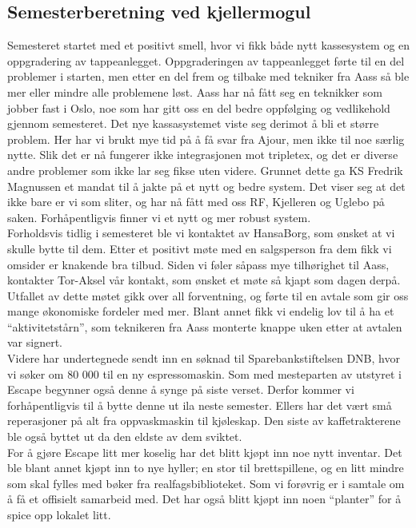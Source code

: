 \documentclass[10pt,norsk,a4paper]{article}
\begin{document}
\subsection{Semesterberetning ved kjellermogul}

\begin{multicols}{2}
Semesteret startet med et positivt smell, hvor vi fikk både nytt kassesystem og en oppgradering av tappeanlegget. Oppgraderingen av tappeanlegget førte til en del problemer i starten, men etter en del frem og tilbake med tekniker fra Aass så ble mer eller mindre alle problemene løst. Aass har nå fått seg en teknikker som jobber fast i Oslo, noe som har gitt oss en del bedre oppfølging og vedlikehold gjennom semesteret. Det nye kassasystemet viste seg derimot å bli et større problem. Her har vi brukt mye tid på å få svar fra Ajour, men ikke til noe særlig nytte. Slik det er nå fungerer ikke integrasjonen mot tripletex, og det er diverse andre problemer som ikke lar seg fikse uten videre. Grunnet dette ga KS Fredrik Magnussen et mandat til å jakte på et nytt og bedre system. Det viser seg at det ikke bare er vi som sliter, og har nå fått med oss RF, Kjelleren og Uglebo på saken. Forhåpentligvis finner vi et nytt og mer robust system.\\

Forholdsvis tidlig i semesteret ble vi kontaktet av HansaBorg, som ønsket at vi skulle bytte til dem. Etter et positivt møte med en salgsperson fra dem fikk vi omsider er knakende bra tilbud. Siden vi føler såpass mye tilhørighet til Aass, kontakter Tor-Aksel vår kontakt, som ønsket et møte så kjapt som dagen derpå. Utfallet av dette møtet gikk over all forventning, og førte til en avtale som gir oss mange økonomiske fordeler med mer. Blant annet fikk vi endelig lov til å ha et “aktivitetstårn”, som teknikeren fra Aass monterte knappe uken etter at avtalen var signert.\\

Videre har undertegnede sendt inn en søknad til Sparebankstiftelsen DNB, hvor vi søker om 80 000 til en ny espressomaskin. Som med mesteparten av utstyret i Escape begynner også denne å synge på siste verset. Derfor kommer vi forhåpentligvis til å bytte denne ut ila neste semester. Ellers har det vært små reperasjoner på alt fra oppvaskmaskin til kjøleskap. Den siste av kaffetrakterene ble også byttet ut da den eldste av dem sviktet.\\

For å gjøre Escape litt mer koselig har det blitt kjøpt inn noe nytt inventar. Det ble blant annet kjøpt inn to nye hyller; en stor til brettspillene, og en litt mindre som skal fylles med bøker fra realfagsbiblioteket. Som vi forøvrig er i samtale om å få et offisielt samarbeid med. Det har også blitt kjøpt inn noen “planter” for å spice opp lokalet litt.\\


\end{multicols}
\end{document}
